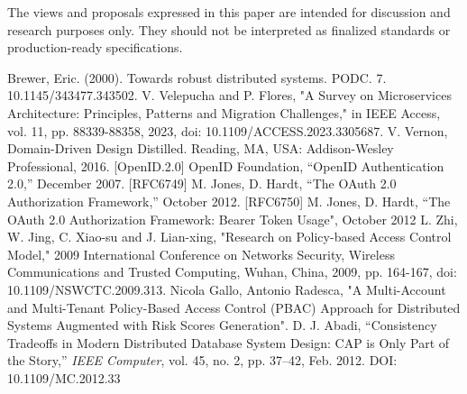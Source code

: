 \documentclass[letterpaper, 10 pt, conference]{ieeeconf}  %
\begin{document}
\vspace{1em}
The views and proposals expressed in this paper are intended for discussion and research purposes only. 
They should not be interpreted as finalized standards or production-ready specifications.

\addtolength{\textheight}{-12cm}   %


\begin{thebibliography}{99}
 Brewer, Eric. (2000). Towards robust distributed systems. PODC. 7. 10.1145/343477.343502. 
 V. Velepucha and P. Flores, "A Survey on Microservices Architecture: Principles, Patterns and Migration Challenges," in IEEE Access, vol. 11, pp. 88339-88358, 2023, doi: 10.1109/ACCESS.2023.3305687.
 V. Vernon, Domain-Driven Design Distilled. Reading, MA, USA: Addison-Wesley Professional, 2016.
 [OpenID.2.0] OpenID Foundation, “OpenID Authentication 2.0,” December 2007.
 [RFC6749]	M. Jones, D. Hardt, “The OAuth 2.0 Authorization Framework,” October 2012.
 [RFC6750]	M. Jones, D. Hardt, “The OAuth 2.0 Authorization Framework: Bearer Token Usage", October 2012
 L. Zhi, W. Jing, C. Xiao-su and J. Lian-xing, "Research on Policy-based Access Control Model," 2009 International Conference on Networks Security, Wireless Communications and Trusted Computing, Wuhan, China, 2009, pp. 164-167, doi: 10.1109/NSWCTC.2009.313.
 Nicola Gallo, Antonio Radesca, "A Multi-Account and Multi-Tenant Policy-Based Access Control (PBAC) Approach for Distributed Systems Augmented with Risk Scores Generation".
 D. J. Abadi, “Consistency Tradeoffs in Modern Distributed Database System Design: CAP is Only Part of the Story,” \emph{IEEE Computer}, vol. 45, no. 2, pp. 37–42, Feb. 2012. DOI: 10.1109/MC.2012.33
\end{thebibliography}
\end{document}
